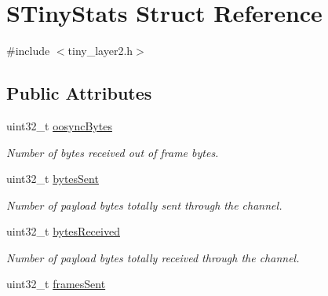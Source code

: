 \hypertarget{structSTinyStats}{}\section{S\+Tiny\+Stats Struct Reference}
\label{structSTinyStats}


{\ttfamily \#include $<$tiny\+\_\+layer2.\+h$>$}

\subsection*{Public Attributes}
\begin{DoxyCompactItemize}
\item 
\hypertarget{structSTinyStats_a79119146606964d4e3345a0c019db329}{}uint32\+\_\+t \hyperlink{structSTinyStats_a79119146606964d4e3345a0c019db329}{oosync\+Bytes}\label{structSTinyStats_a79119146606964d4e3345a0c019db329}

\begin{DoxyCompactList}\small\item\em Number of bytes received out of frame bytes. \end{DoxyCompactList}\item 
\hypertarget{structSTinyStats_a3ee26fa17e5afd758b4c7f2086bc0cbc}{}uint32\+\_\+t \hyperlink{structSTinyStats_a3ee26fa17e5afd758b4c7f2086bc0cbc}{bytes\+Sent}\label{structSTinyStats_a3ee26fa17e5afd758b4c7f2086bc0cbc}

\begin{DoxyCompactList}\small\item\em Number of payload bytes totally sent through the channel. \end{DoxyCompactList}\item 
\hypertarget{structSTinyStats_ab58c342d0fc862c193bff6f71dc725ac}{}uint32\+\_\+t \hyperlink{structSTinyStats_ab58c342d0fc862c193bff6f71dc725ac}{bytes\+Received}\label{structSTinyStats_ab58c342d0fc862c193bff6f71dc725ac}

\begin{DoxyCompactList}\small\item\em Number of payload bytes totally received through the channel. \end{DoxyCompactList}\item 
\hypertarget{structSTinyStats_a0bc110aa81a7dea0d0d64e359fb06dc3}{}uint32\+\_\+t \hyperlink{structSTinyStats_a0bc110aa81a7dea0d0d64e359fb06dc3}{frames\+Sent}\label{structSTinyStats_a0bc110aa81a7dea0d0d64e359fb06dc3}


\end{DoxyCompactItemize}
